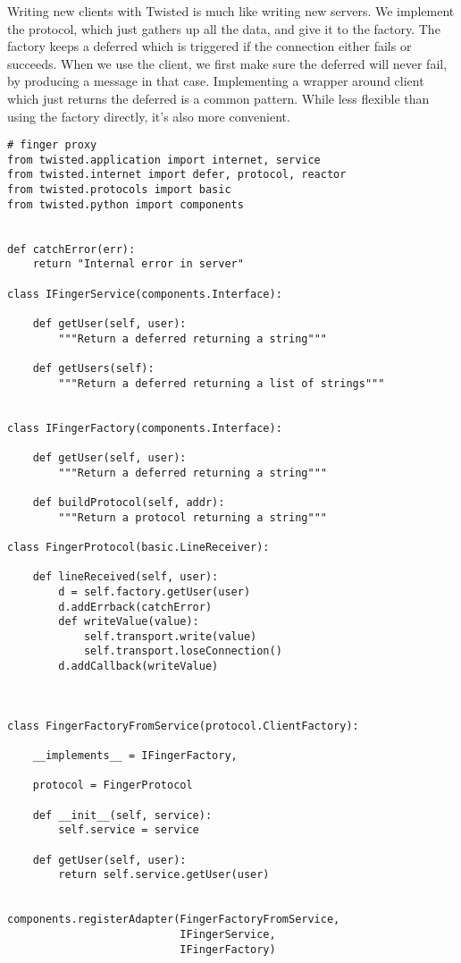 Writing new clients with Twisted is much like writing new servers. We implement the protocol, which just gathers up all the data, and give it to the factory. The factory keeps a deferred which is triggered if the connection either fails or succeeds. When we use the client, we first make sure the deferred will never fail, by producing a message in that case. Implementing a wrapper around client which just returns the deferred is a common pattern.  While less flexible than using the factory directly, it's also more convenient.\begin{verbatim}
# finger proxy
from twisted.application import internet, service
from twisted.internet import defer, protocol, reactor
from twisted.protocols import basic
from twisted.python import components


def catchError(err):
    return "Internal error in server"

class IFingerService(components.Interface):

    def getUser(self, user):
        """Return a deferred returning a string"""

    def getUsers(self):
        """Return a deferred returning a list of strings"""


class IFingerFactory(components.Interface):

    def getUser(self, user):
        """Return a deferred returning a string"""

    def buildProtocol(self, addr):
        """Return a protocol returning a string"""

class FingerProtocol(basic.LineReceiver):

    def lineReceived(self, user):
        d = self.factory.getUser(user)
        d.addErrback(catchError)
        def writeValue(value):
            self.transport.write(value)
            self.transport.loseConnection()
        d.addCallback(writeValue)



class FingerFactoryFromService(protocol.ClientFactory):

    __implements__ = IFingerFactory,

    protocol = FingerProtocol

    def __init__(self, service):
        self.service = service

    def getUser(self, user):
        return self.service.getUser(user)


components.registerAdapter(FingerFactoryFromService,
                           IFingerService,
                           IFingerFactory)


\end{verbatim}
